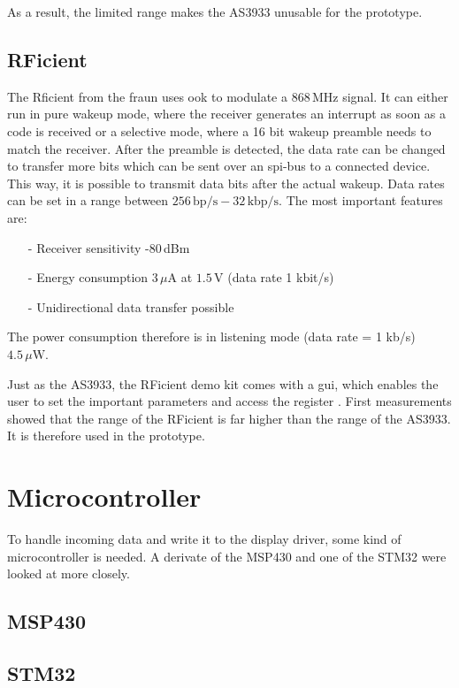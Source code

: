 As a result, the limited range makes the AS3933 unusable for the prototype. 

\subsection{RFicient}
The Rficient from the \acs{fraun} uses \acs{ook} to modulate a 868\,MHz signal.
It can either run in pure wakeup mode, where the receiver generates an interrupt as soon as a code is received or a selective mode, where a 16 bit wakeup preamble needs to match the receiver. 
After the preamble is detected, the data rate can be changed to transfer more bits which can be sent over an \acs{spi}-bus to a connected device.
This way, it is possible to transmit data bits after the actual wakeup.
Data rates can be set in a range between $256\,\text{bp/s}-32\,\text{kbp/s}$.
The most important features are:
\begin{itemize}
	\item[-] Receiver sensitivity -80\,dBm
	\item[-] Energy consumption $3\,\mu\text{A}$ at $1.5\,\text{V}$ (data rate 1 kbit/s)
	\item[-] Unidirectional data transfer possible	
\end{itemize}
The power consumption therefore is in listening mode (data rate = 1 kb/s) $4.5\,\mu\text{W}$.

Just as the AS3933, the RFicient demo kit comes with a \acs{gui}, which enables the user to set the important parameters and access the register \cite{rficient}.
First measurements showed that the range of the RFicient is far higher than the range of the AS3933.
It is therefore used in the prototype.

\section{Microcontroller}
To handle incoming data and write it to the display driver, some kind of microcontroller is needed.
A derivate of the MSP430 and one of the STM32 were looked at more closely.

\subsection{MSP430}



\subsection{STM32}